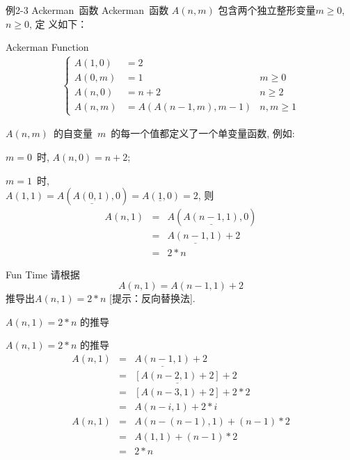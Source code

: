 \documentclass[fontset=fandol,UTF8,fleqn]{beamer}
\begin{document}
\begin{frame}{例2-3 Ackerman~函数}
Ackerman~函数 $A(n, m)$ 包含两个独立整形变量$m \geq 0$, $n\geq 0$, 定
义如下：
\begin{exampleblock}{Ackerman Function}  
\begin{eqnarray*}
  \left\{\begin{array}{lll}
A(1, 0) & =2 & \\
A(0, m)& =1 &  m \geq 0\\
A(n, 0) & = n + 2 & n \geq 2\\
A(n, m)& =A(A(n-1, m), m-1) & n, m \geq 1
\end{array}\right. 
\end{eqnarray*}
\end{exampleblock}
\end{frame}

\begin{frame}{}
  \begin{exampleblock}{}
    $A(n,  m)$~的自变量~$m$~的每一个值都定义了一个单变量函数,  例如:  

$m=0$~时,    $A(n, 0)=n+2$; 

 $m=1$~时,　  \\
$A(1, 1)=A(\underline{A(0,1)},0)=A(\underline{1},0)=2$, 则  
 \begin{eqnarray*}
      A(n, 1) & = & A(\underline{A(n-1, 1)}, 0)  \\
& = & \underline{A(n-1, 1)}+2  \\  
& = & 2*n  
 \end{eqnarray*}
\end{exampleblock}
\end{frame}

\begin{frame}{Fun Time}
  请根据
    \begin{displaymath}
  A(n, 1)  =  A(n-1, 1)+2
\end{displaymath}
推导出$A(n,1)=2*n$ [提示：反向替换法].
\end{frame}

\begin{frame}{$A(n, 1)=2*n$ 的推导}
  \begin{exampleblock}{$A(n, 1)=2*n$ 的推导}
\begin{eqnarray*}
  A(n, 1) & = & \underline{A(n-1, 1)}+2   \\
 &  = & \underline{[A(n-2, 1)+2]}+2   \\  
&  = & [A(n-3, 1)+2]+2* 2   \\
& = & A(n-i, 1)+2* i  \\
A(n, 1) & = & A(n-(n-1), 1)+(n-1)* 2   \\
& = & A(1,1)+(n-1)* 2   \\
& = & 2*n  
\end{eqnarray*}
\end{exampleblock}
\end{frame}
\end{document}
